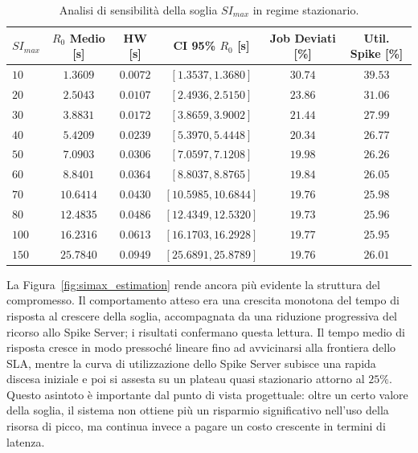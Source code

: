 ﻿\documentclass[a4paper,12pt]{article}
\begin{document}
\begin{table}[H]
    \centering
    \small
    \renewcommand{\arraystretch}{1.3}
    \begin{tabular}{lccccc}
        \hline
        \textbf{$SI_{max}$} & \textbf{$R_0$ Medio [s]} & \textbf{HW [s]} & \textbf{CI 95\% $R_0$ [s]} & \textbf{Job Deviati [\%]} & \textbf{Util. Spike [\%]} \\ \hline
        $10$   & $1.3609$  & $0.0072$ & $[1.3537, 1.3680]$   & $30.74$ & $39.53$ \\
        $20$   & $2.5043$  & $0.0107$ & $[2.4936, 2.5150]$   & $23.86$ & $31.06$ \\
        $30$   & $3.8831$  & $0.0172$ & $[3.8659, 3.9002]$   & $21.44$ & $27.99$ \\
        $40$   & $5.4209$  & $0.0239$ & $[5.3970, 5.4448]$   & $20.34$ & $26.77$ \\
        $50$   & $7.0903$  & $0.0306$ & $[7.0597, 7.1208]$   & $19.98$ & $26.26$ \\
        $60$   & $8.8401$  & $0.0364$ & $[8.8037, 8.8765]$   & $19.84$ & $26.05$ \\
        $70$   & $10.6414$ & $0.0430$ & $[10.5985, 10.6844]$ & $19.76$ & $25.98$ \\
        $80$   & $12.4835$ & $0.0486$ & $[12.4349, 12.5320]$ & $19.73$ & $25.96$ \\
        $100$  & $16.2316$ & $0.0613$ & $[16.1703, 16.2928]$ & $19.77$ & $25.95$ \\
        $150$  & $25.7840$ & $0.0949$ & $[25.6891, 25.8789]$ & $19.76$ & $26.01$ \\ \hline
    \end{tabular}
    \caption{Analisi di sensibilità della soglia $SI_{max}$ in regime stazionario.}
    \label{tab:simax_estimation_results}
\end{table}

La Figura~\ref{fig:simax_estimation} rende ancora più evidente la struttura del compromesso. Il comportamento atteso era una crescita monotona del tempo di risposta al crescere della soglia, accompagnata da una riduzione progressiva del ricorso allo Spike Server; i risultati confermano questa lettura. Il tempo medio di risposta cresce in modo pressoché lineare fino ad avvicinarsi alla frontiera dello SLA, mentre la curva di utilizzazione dello Spike Server subisce una rapida discesa iniziale e poi si assesta su un plateau quasi stazionario attorno al $25\%$. Questo asintoto è importante dal punto di vista progettuale: oltre un certo valore della soglia, il sistema non ottiene più un risparmio significativo nell'uso della risorsa di picco, ma continua invece a pagare un costo crescente in termini di latenza.
\end{document}
